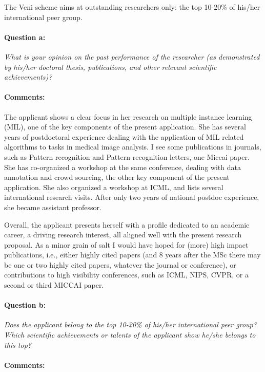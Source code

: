 \documentclass[serif, twocolumn, numeric, rga]{jote-article}
\begin{document}
The Veni scheme aims at outstanding researchers only: the top 10-20\% of his/her international peer group.

\paragraph{Question a:}
\textit{What is your opinion on the past performance of the researcher (as demonstrated by his/her doctoral thesis, publications, and other relevant scientific achievements)?}

\paragraph{Comments:}

The applicant shows a clear focus in her research on multiple instance learning (MIL), one of the key components of the present application. She has several years of postdoctoral experience dealing with the application of MIL related algorithms to tasks in medical image analysis. I see some publications in journals, such as Pattern recognition and Pattern recognition letters, one Miccai paper. She has co-organized a workshop at the same conference, dealing with data annotation and crowd sourcing, the other key component of the present application. She also organized a workshop at ICML, and lists several international research visits. After only two years of national postdoc experience, she became assistant professor.

Overall, the applicant presents herself with a profile dedicated to an academic career, a driving research interest, all aligned well with the present research proposal. As a minor grain of salt I would have hoped for (more) high impact publications, i.e., either highly cited papers (and 8 years after the MSc there may be one or two highly cited papers, whatever the journal or conference), or contributions to high visibility conferences, such as ICML, NIPS, CVPR, or a second or third MICCAI paper.

\paragraph{Question b:}
\textit{Does the applicant belong to the top 10-20\% of his/her international peer group? Which scientific achievements or talents of the applicant show he/she belongs to this top?}

\paragraph{Comments:}
\end{document}
